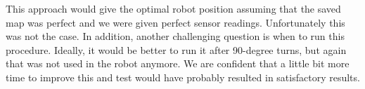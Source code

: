 This approach would give the optimal robot position assuming that the saved map was perfect and we were given perfect sensor readings. Unfortunately this was not the case. In addition, another challenging question is when to run this procedure. Ideally, it would be better to run it after 90-degree turns, but again that was not used in the robot anymore. We are confident that a little bit more time to improve this and test would have probably resulted in satisfactory results.

